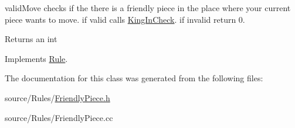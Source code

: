 validMove checks if the there is a friendly piece in the place where your current piece wants to move. if valid calls \hyperlink{classKingInCheck}{KingInCheck}. if invalid return 0. \begin{DoxyReturn}{Returns}
an int 
\end{DoxyReturn}


Implements \hyperlink{classRule}{Rule}.

The documentation for this class was generated from the following files:\begin{DoxyCompactItemize}
\item 
source/Rules/\hyperlink{FriendlyPiece_8h}{FriendlyPiece.h}\item 
source/Rules/FriendlyPiece.cc\end{DoxyCompactItemize}
